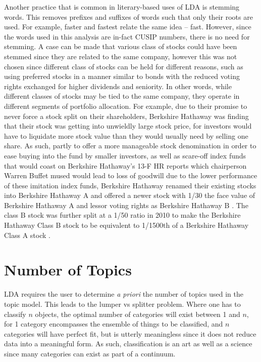 Another practice that is common in literary-based uses of LDA is stemming words. This removes prefixes and suffixes of words such that only their roots are used.  For example, faster and fastest relate the same idea -- fast.  However, since the words used in this analysis are in-fact CUSIP numbers, there is no need for stemming.   A case can be made that various class of stocks could have been stemmed since they are related to the same company, however this was not chosen since different class of stocks can be held for different reasons, such as using preferred stocks in a manner similar to bonds with the reduced voting rights exchanged for higher dividends and seniority. In other words, while different classes of stocks may be tied to the same company, they operate in different segments of portfolio allocation. For example, due to their promise to never force a stock split on their shareholders, Berkshire Hathaway was finding that their stock was getting into unwieldly large stock price, for investors would have to liquidate more stock value than they would usually need by selling one share.  As such, partly to offer a more manageable stock denomination in order to ease buying into the fund by smaller investors, as well as scare-off index funds that would coast on Berkshire Hathaway's 13-F HR reports which chairperson Warren Buffet mused would lead to loss of goodwill due to the lower performance of these imitation index funds, Berkshire Hathaway renamed their existing stocks into Berkshire Hathaway A and offered a newer stock with 1/30 the face value of Berkshire Hathaway A and lessor voting rights as Berkshire Hathaway B \citep{Buffet96}.  The class B stock was further split at a 1/50 ratio in 2010 to make the Berkshire Hathaway Class B stock to be equivalent to 1/1500th of a Berkshire Hathaway Class A stock \citep{Crippen2010}.



\section{Number of Topics}

LDA requires the user to determine \textit{a priori} the number of topics used in the topic model.  This leads to the lumper vs splitter problem.  Where one has to classify $n$ objects, the optimal number of categories will exist between 1 and $n$, for 1 category encompasses the ensemble of things to be classified, and $n$ categories will have perfect fit, but is utterly meaningless since it does not reduce data into a meaningful form.  As such, classification is an art as well as a science since many categories can exist as part of a continuum.

